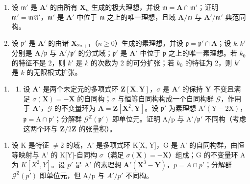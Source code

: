 \begin{enumerate}
\def\labelenumi{(\alph{enumi})}
\setcounter{enumi}{1}
\item
  设 \(\mathfrak{m}'\) 是 \(\mathbf{A}'\) 的由所有 \(\mathbf{X}_n\) 生成的极大理想，并设 \(\mathfrak{m} = \mathbf{A} \cap \mathfrak{m}'\)；证明 \(\mathfrak{m}' = \mathfrak{mA}'\)，\(\mathfrak{m}'\) 是 \(\mathbf{A}'\) 中位于 \(\mathfrak{m}\) 之上的唯一理想，且域 \(\mathbf{A} / \mathfrak{m}\) 与 \(\mathbf{A}' / \mathfrak{m}'\) 典范同构。
\item
  设 \(\mathfrak{p}'\) 是 \(\mathbf{A}'\) 的由诸 \(\mathbf{X}_{2n+1}\)（\(n \geqslant 0\)）生成的素理想，并设 \(\mathfrak{p} = \mathfrak{p}' \cap \mathbf{A}\)；设 \(k, k'\) 分别是 \(\mathbf{A}/\mathfrak{p}\) 与 \(\mathbf{A}'/\mathfrak{p}'\) 的分式域；\(\mathfrak{p}'\) 是 \(\mathbf{A}'\) 中位于 \(\mathfrak{p}\) 之上的唯一素理想。若 \(k_0\) 的特征不是 2，则 \(k'\) 是 \(k\) 的次数为 2 的可分扩张；若 \(k_0\) 的特征为 2，则 \(k'\) 是 \(k\) 的无限根式扩张。
\end{enumerate}

\begin{enumerate}
\def\labelenumi{\arabic{enumi}.}
\setcounter{enumi}{9}
\tightlist
\item
  \begin{enumerate}
  \def\labelenumii{(\alph{enumii})}
  \tightlist
  \item
    设 \(\mathbf{A}'\) 是两个未定元的多项式环 \(\mathbf{Z}[\mathbf{X},\mathbf{Y}]\)，\(\sigma\) 是 \(\mathbf{A}'\) 的保持 \(\mathbf{Y}\) 不变且满足 \(\sigma (\mathbf{X}) = -\mathbf{X}\) 的自同构；\(\sigma\) 与恒等自同构构成一个自同构群 \(\mathcal{G}\)，作用于 \(\mathbf{A}'\)，\(\mathcal{G}\) 的不变量环为 \(\mathbf{A} = \mathbf{Z}[\mathbf{X}^2,\mathbf{Y}]\)。设 \(\mathfrak{p}'\) 为素理想 \(\mathrm{A}'(\mathrm{Y} - 2\mathrm{X})\)，\(\mathfrak{p} = \mathrm{A}\cap \mathfrak{p}'\)；分解群 \(\mathcal{G}^{\mathbb{Z}}(\mathfrak{p}')\) 即单位元。证明 \(\mathrm{A / p}\) 与 \(\mathrm{A}' / \mathfrak{p}'\) 不同构（考虑这两个环与 \(\mathbf{Z} / 2\mathbf{Z}\) 的张量积）。
  \end{enumerate}
\end{enumerate}

\begin{enumerate}
\def\labelenumi{(\alph{enumi})}
\setcounter{enumi}{1}
\tightlist
\item
  设 K 是特征 \(\neq2\) 的域，A' 是多项式环 K{[}X, Y{]}，G 是 A' 的自同构群，由恒等映射与 A' 的 K{[}Y{]}-自同构 \(\sigma\)（满足 \(\sigma(\mathbf{X}) = -\mathbf{X}\)）组成；G 的不变量环 A 为 \(K[X^{2}, Y]\)。设 \(p'\) 是 A' 的素理想 \(\mathbf{A}'(\mathbf{X}^{3} - \mathbf{Y})\)，\(p = A \cap p'\)；分解群 \(\mathcal{G}^{\mathrm{Z}}(p')\) 即单位元，但 A/p 与 \(A'/p'\) 不同构。
\end{enumerate}

